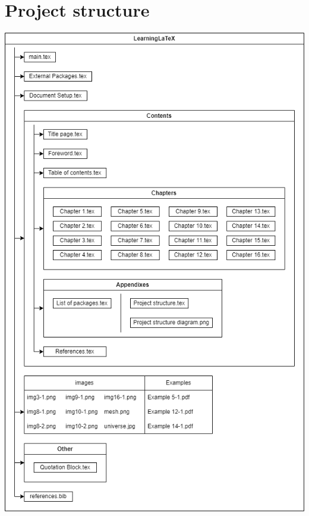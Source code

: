 \section{Project structure}

\centering
\includegraphics[height=0.9\textheight,keepaspectratio]{Contents//Appendixes/Project structure diagram.png}
